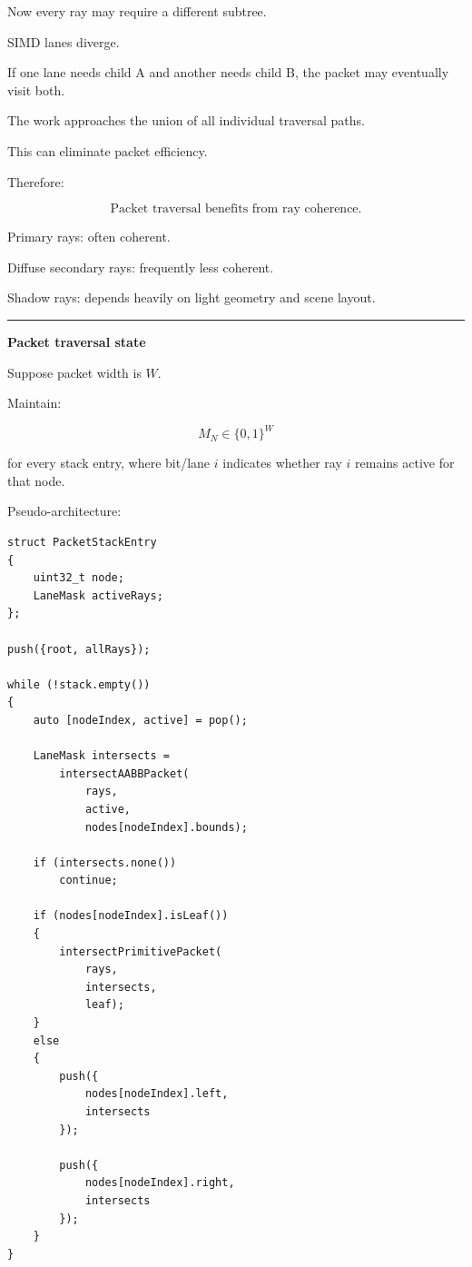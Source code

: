Now every ray may require a different subtree.

SIMD lanes diverge.

If one lane needs child A and another needs child B, the packet may eventually visit both.

The work approaches the union of all individual traversal paths.

This can eliminate packet efficiency.

Therefore:

\[
\boxed{
\text{Packet traversal benefits from ray coherence.}
}
\]

Primary rays: often coherent.

Diffuse secondary rays: frequently less coherent.

Shadow rays: depends heavily on light geometry and scene layout.

\begin{center}\rule{0.5\linewidth}{0.5pt}\end{center}

\textbf{Packet traversal state}

Suppose packet width is \(W\).

Maintain:

\[
M_N\in\{0,1\}^W
\]

for every stack entry, where bit/lane \(i\) indicates whether ray \(i\) remains active for that node.

Pseudo-architecture:

\begin{verbatim}
struct PacketStackEntry
{
    uint32_t node;
    LaneMask activeRays;
};

push({root, allRays});

while (!stack.empty())
{
    auto [nodeIndex, active] = pop();

    LaneMask intersects =
        intersectAABBPacket(
            rays,
            active,
            nodes[nodeIndex].bounds);

    if (intersects.none())
        continue;

    if (nodes[nodeIndex].isLeaf())
    {
        intersectPrimitivePacket(
            rays,
            intersects,
            leaf);
    }
    else
    {
        push({
            nodes[nodeIndex].left,
            intersects
        });

        push({
            nodes[nodeIndex].right,
            intersects
        });
    }
}
\end{verbatim}

